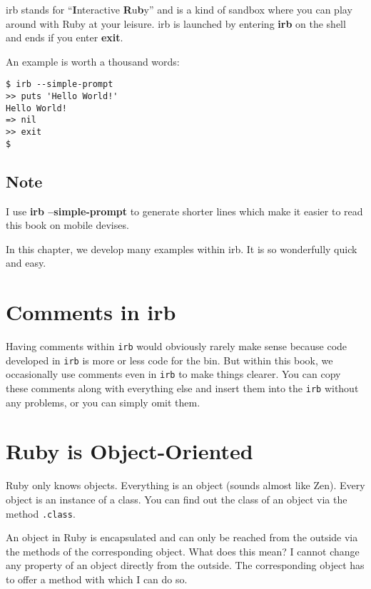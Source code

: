 \documentclass[a4paper]{book}
\begin{document}
irb stands for “\textbf{I}nteractive \textbf{R}u\textbf{b}y” and is a kind of sandbox where you can play around with Ruby at your leisure. irb is launched by entering \textbf{irb} on the shell and ends if you enter \textbf{exit}.

An example is worth a thousand words:

\begin{shaded}\begin{verbatim}
$ irb --simple-prompt
>> puts 'Hello World!'
Hello World!
=> nil
>> exit
$
\end{verbatim}\end{shaded}

\subsection{Note}\label{note-3}

I use \textbf{irb --simple-prompt} to generate shorter lines which make it easier to read this book on mobile devises.

In this chapter, we develop many examples within irb. It is so wonderfully quick and easy.

\section{Comments in irb}\label{comments-in-irb}

Having comments within \texttt{irb} would obviously rarely make sense because code developed in \texttt{irb} is more or less code for the bin. But within this book, we occasionally use comments even in \texttt{irb} to make things clearer. You can copy these comments along with everything else and insert them into the \texttt{irb} without any problems, or you can simply omit them.

\section{Ruby is Object-Oriented}\label{ruby-is-object-oriented}

Ruby only knows objects. Everything is an object (sounds almost like Zen). Every object is an instance of a class. You can find out the class of an object via the method \texttt{.class}.

An object in Ruby is encapsulated and can only be reached from the outside via the methods of the corresponding object. What does this mean? I cannot change any property of an object directly from the outside. The corresponding object has to offer a method with which I can do so.
\end{document}
